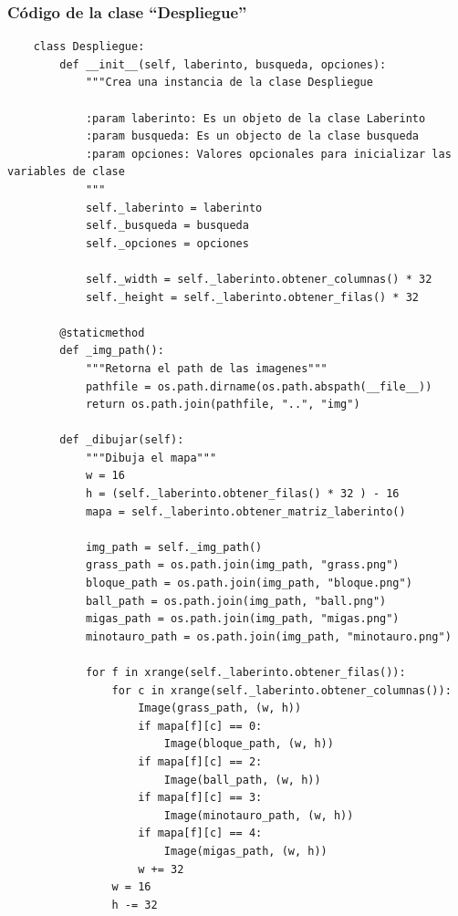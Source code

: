 \documentclass[letter, titlepage, 10pt]{article}
\begin{document}
\subsubsection{Código de la clase ``Despliegue''}
\begin{lstlisting}
    class Despliegue:
        def __init__(self, laberinto, busqueda, opciones):
            """Crea una instancia de la clase Despliegue
            
            :param laberinto: Es un objeto de la clase Laberinto
            :param busqueda: Es un objecto de la clase busqueda
            :param opciones: Valores opcionales para inicializar las variables de clase
            """
            self._laberinto = laberinto
            self._busqueda = busqueda
            self._opciones = opciones
    
            self._width = self._laberinto.obtener_columnas() * 32
            self._height = self._laberinto.obtener_filas() * 32
    
        @staticmethod
        def _img_path():
            """Retorna el path de las imagenes"""
            pathfile = os.path.dirname(os.path.abspath(__file__))
            return os.path.join(pathfile, "..", "img")
    
        def _dibujar(self):
            """Dibuja el mapa"""
            w = 16
            h = (self._laberinto.obtener_filas() * 32 ) - 16
            mapa = self._laberinto.obtener_matriz_laberinto()
    
            img_path = self._img_path()
            grass_path = os.path.join(img_path, "grass.png")
            bloque_path = os.path.join(img_path, "bloque.png")
            ball_path = os.path.join(img_path, "ball.png")
            migas_path = os.path.join(img_path, "migas.png")
            minotauro_path = os.path.join(img_path, "minotauro.png")
    
            for f in xrange(self._laberinto.obtener_filas()):
                for c in xrange(self._laberinto.obtener_columnas()):
                    Image(grass_path, (w, h))
                    if mapa[f][c] == 0:
                        Image(bloque_path, (w, h))
                    if mapa[f][c] == 2:
                        Image(ball_path, (w, h))
                    if mapa[f][c] == 3:
                        Image(minotauro_path, (w, h))
                    if mapa[f][c] == 4:
                        Image(migas_path, (w, h))
                    w += 32
                w = 16
                h -= 32
        

\end{lstlisting}
\end{document}
